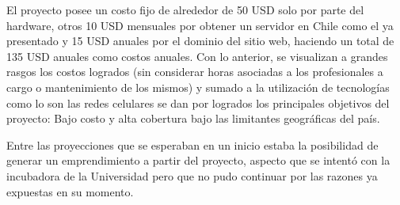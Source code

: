 El proyecto posee un costo fijo de alrededor de 50 USD solo por parte del hardware, otros 10 USD mensuales por obtener un servidor en Chile como el ya presentado y 15 USD anuales por el dominio del sitio web, haciendo un total de 135 USD anuales como costos anuales. Con lo anterior, se visualizan a grandes rasgos los costos logrados (sin considerar horas asociadas a los profesionales a cargo o mantenimiento de los mismos) y sumado a la utilización de tecnologías como lo son las redes celulares se dan por logrados los principales objetivos del proyecto: Bajo costo y alta cobertura bajo las limitantes geográficas del país.

Entre las proyecciones que se esperaban en un inicio estaba la posibilidad de generar un emprendimiento a partir del proyecto, aspecto que se intentó con la incubadora de la Universidad pero que no pudo continuar por las razones ya expuestas en su momento. 